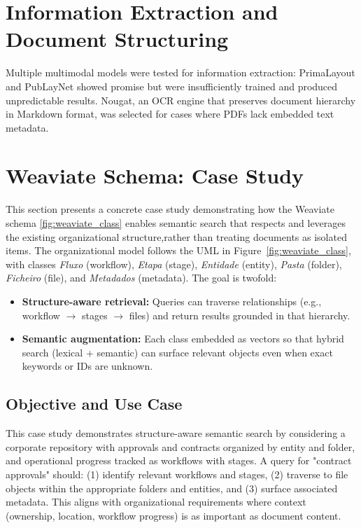 \section{Information Extraction and Document Structuring}

Multiple multimodal models were tested for information extraction: PrimaLayout and PubLayNet showed promise but were insufficiently trained and produced unpredictable results. Nougat, an OCR engine that preserves document hierarchy in Markdown format, was selected for cases where PDFs lack embedded text metadata.
\section{Weaviate Schema: Case Study}
\label{sec:schema_example_study}

This section presents a concrete case study demonstrating how the Weaviate schema \ref{fig:weaviate_class} enables semantic search that respects and leverages the existing organizational structure,rather than treating documents as isolated items. The organizational model follows the UML in Figure~\ref{fig:weaviate_class}, with classes \textit{Fluxo} (workflow), \textit{Etapa} (stage), \textit{Entidade} (entity), \textit{Pasta} (folder), \textit{Ficheiro} (file), and \textit{Metadados} (metadata). The goal is twofold:

\begin{itemize}
    \item \textbf{Structure-aware retrieval:} Queries can traverse relationships (e.g., workflow \(\rightarrow\) stages \(\rightarrow\) files) and return results grounded in that hierarchy.
    \item \textbf{Semantic augmentation:} Each class embedded as vectors so that hybrid search (lexical + semantic) can surface relevant objects even when exact keywords or IDs are unknown.
\end{itemize}

\subsection{Objective and Use Case}

This case study demonstrates structure-aware semantic search by considering a corporate repository with approvals and contracts organized by entity and folder, and operational progress tracked as workflows with stages. A query for "contract approvals" should: (1) identify relevant workflows and stages, (2) traverse to file objects within the appropriate folders and entities, and (3) surface associated metadata. This aligns with organizational requirements where context (ownership, location, workflow progress) is as important as document content.

